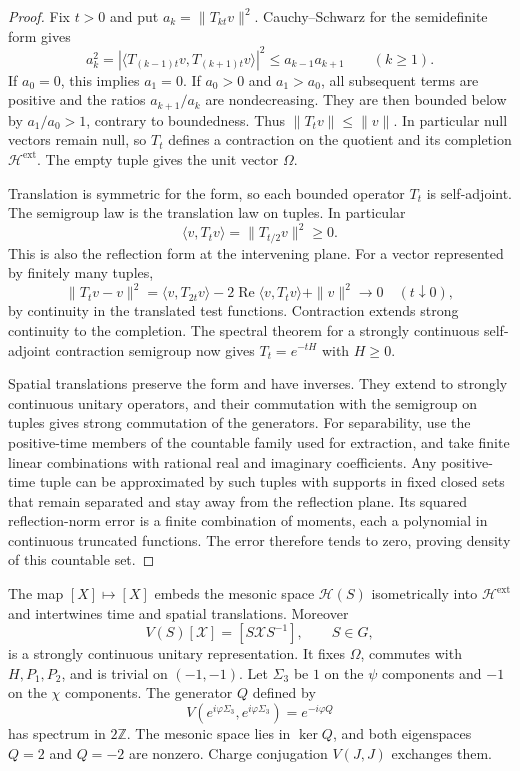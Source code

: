 \documentclass[11pt,letterpaper,reqno]{amsart}
\makeatletter
\theoremstyle{definition}
\newcommand{\ms@minorstart}{%
  \pushQED{\qed}\renewcommand{\qedsymbol}{$\blacksquare$}}
\newenvironment{proposition}[1][]{\ms@minorstart\ms@proposition[#1]}
  {\popQED\endms@proposition}
\theoremstyle{remark}
\makeatother
\begin{document}
\begin{proof}
Fix $t>0$ and put $a_k=\|T_{kt}v\|^2$. Cauchy--Schwarz
for the semidefinite form gives
\[
 a_k^2=|\langle T_{(k-1)t}v,T_{(k+1)t}v\rangle|^2
                 \le a_{k-1}a_{k+1}\qquad(k\ge1).
\]
If $a_0=0$, this implies $a_1=0$. If $a_0>0$ and
$a_1>a_0$, all subsequent terms are positive and the
ratios $a_{k+1}/a_k$ are nondecreasing. They are then
bounded below by $a_1/a_0>1$, contrary to boundedness.
Thus $\|T_tv\|\le\|v\|$. In particular null vectors
remain null, so $T_t$ defines a contraction on the quotient
and its completion $\mathcal H^{\mathrm{ext}}$.
The empty tuple gives the unit vector $\Omega$.

Translation is symmetric for the form, so each bounded
operator $T_t$ is self-adjoint. The semigroup law is the
translation law on tuples. In particular
\[
 \langle v,T_tv\rangle=\|T_{t/2}v\|^2\ge0.
\]
This is also the reflection form at the intervening plane.
For a vector represented by finitely many tuples,
\[
 \|T_tv-v\|^2
 =\langle v,T_{2t}v\rangle
       -2\operatorname{Re}\langle v,T_tv\rangle+\|v\|^2
       \longrightarrow0
       \quad(t\downarrow0),
\]
by continuity in the translated test functions. Contraction
extends strong continuity to the completion. The spectral
theorem for a strongly continuous self-adjoint contraction
semigroup now gives $T_t=e^{-tH}$ with $H\ge0$.

Spatial translations preserve the form and have
inverses. They extend to strongly continuous unitary
operators, and their commutation with the semigroup
on tuples gives strong commutation of the generators.
For separability, use the positive-time members of the
countable family used for extraction, and take finite
linear combinations with rational real and imaginary
coefficients. Any positive-time tuple can be approximated
by such tuples with supports in fixed closed sets that
remain separated and stay away from the reflection plane.
Its squared reflection-norm error is a finite combination
of moments, each a polynomial in continuous truncated
functions. The error therefore tends to zero, proving
density of this countable set.
\end{proof}

\begin{proposition}[The internal group on the enlarged space]
\label{C-401-46}
The map $[X]\mapsto[X]$ embeds the mesonic space
$\mathcal H(S)$ isometrically into $\mathcal H^{\mathrm{ext}}$
and intertwines time and spatial translations. Moreover
\[
 V(S)[\mathcal X]=[S\mathcal X S^{-1}],\qquad S\in G,
\]
is a strongly continuous unitary representation. It fixes
$\Omega$, commutes with $H,P_1,P_2$, and is trivial on
$(-1,-1)$. Let $\Sigma_3$ be $1$ on the $\psi$ components
and $-1$ on the $\chi$ components. The generator $Q$ defined by
\[
 V(e^{i\varphi\Sigma_3},e^{i\varphi\Sigma_3})=e^{-i\varphi Q}
\]
has spectrum in $2\mathbb Z$. The mesonic space lies in
$\ker Q$, and both eigenspaces $Q=2$ and $Q=-2$ are
nonzero. Charge conjugation $V(J,J)$ exchanges them.
\end{proposition}
\end{document}
